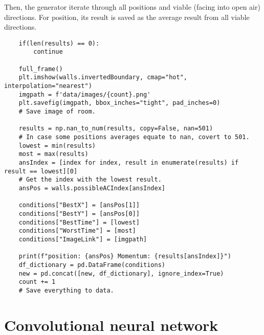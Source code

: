 Then, the generator iterate through all positions and viable (facing into open air) directions. For position, its result is saved as the average result from all viable directions.
\begin{verbatim}
    if(len(results) == 0):
        continue

    full_frame()
    plt.imshow(walls.invertedBoundary, cmap="hot", interpolation="nearest")
    imgpath = f'data/images/{count}.png'
    plt.savefig(imgpath, bbox_inches="tight", pad_inches=0)
    # Save image of room.
   
    results = np.nan_to_num(results, copy=False, nan=501)
    # In case some positions averages equate to nan, covert to 501.
    lowest = min(results)
    most = max(results)
    ansIndex = [index for index, result in enumerate(results) if result == lowest][0]
    # Get the index with the lowest result.
    ansPos = walls.possibleACIndex[ansIndex]

    conditions["BestX"] = [ansPos[1]]
    conditions["BestY"] = [ansPos[0]]
    conditions["BestTime"] = [lowest]
    conditions["WorstTime"] = [most]
    conditions["ImageLink"] = [imgpath]

    print(f"position: {ansPos} Momentum: {results[ansIndex]}")
    df_dictionary = pd.DataFrame(conditions)
    new = pd.concat([new, df_dictionary], ignore_index=True)
    count += 1
    # Save everything to data.
\end{verbatim}

\section{Convolutional neural network}

